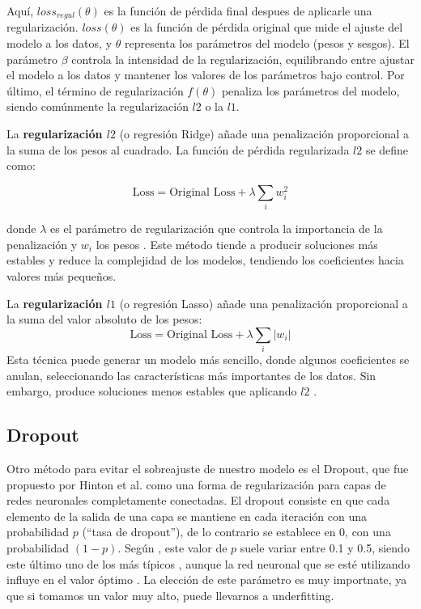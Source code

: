 Aquí, \( loss_{regul}(\theta) \) es la función de pérdida final despues de aplicarle una regularización. \( loss(\theta) \) es la función de pérdida original que mide el ajuste del modelo a los datos, y \( \theta \) representa los parámetros del modelo (pesos y sesgos). El parámetro \(\beta\) controla la intensidad de la regularización, equilibrando entre ajustar el modelo a los datos y mantener los valores de los parámetros bajo control. Por último, el término de regularización \( f(\theta) \) penaliza los parámetros del modelo, siendo comúnmente la regularización $l2$ o la $l1$. 
 

La \textbf{regularización \(l2\)} (o regresión Ridge) añade una penalización proporcional a la suma de los pesos al cuadrado. La función de pérdida regularizada \(l2\) se define como:

\begin{equation}
\text{Loss} = \text{Original Loss} + \lambda \sum_{i} w_i^2
\end{equation}

donde \(\lambda\) es el parámetro de regularización que controla la importancia de la penalización y $w_i$ los pesos \citep{geron2022hands}. Este método tiende a producir soluciones más estables y reduce la complejidad de los modelos, tendiendo los coeficientes hacia valores más pequeños.


La \textbf{regularización \(l1\)} (o regresión Lasso) añade una penalización proporcional a la suma del valor absoluto de los pesos:
\begin{equation}
\text{Loss} = \text{Original Loss} + \lambda \sum_{i} |w_i|
\end{equation}
Esta técnica puede generar un modelo más sencillo, donde algunos coeficientes se anulan, seleccionando las características más importantes de los datos. Sin embargo, produce soluciones menos estables que aplicando $l2$ \citep{geron2022hands}. 


\subsection{Dropout} \label{sec:dropout}

Otro método para evitar el sobreajuste de nuestro modelo es el Dropout, que fue propuesto por Hinton et al. \citep{hinton2012improving} como una forma de regularización para capas de redes neuronales completamente conectadas. El dropout consiste en que cada elemento de la salida de una capa se mantiene en cada iteración con una probabilidad \(p\) (``tasa de dropout''), de lo contrario se establece en 0, con una probabilidad \((1 - p)\). Según \citep{geron2022hands}, este valor de $p$ suele variar entre 0.1 y 0.5, siendo este último uno de los más típicos \citep{srivastava2013improving}, aunque la red neuronal que se esté utilizando influye en el valor óptimo \citep{geron2022hands}. La elección de este parámetro es muy importnate, ya que si tomamos un valor muy alto, puede llevarnos a underfitting.
    
